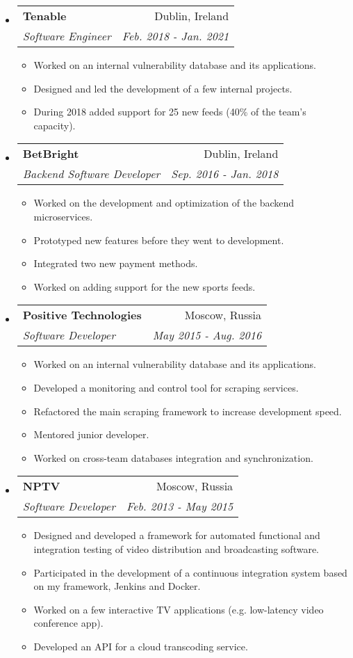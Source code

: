 \documentclass[a4,11pt]{article}
\makeatletter
\newcommand{\resitem}[1]{\item #1 \vspace{-2pt}}
\newcommand{\ressubheading}[4]{
\begin{tabular*}{6.5in}{l@{\cftdotfill{\cftsecdotsep}\extracolsep{\fill}}r}
		\textbf{#1} & #2 \\
		\textit{#3} & \textit{#4} \\
\end{tabular*}\vspace{-6pt}}
\makeatother
\begin{document}
\begin{itemize}
	\item
	      \ressubheading{Tenable}{Dublin, Ireland}{Software Engineer}{Feb. 2018 - Jan. 2021}
	      \begin{itemize}
		      \resitem{Worked on an internal vulnerability database and its applications.}
		      \resitem{Designed and led the development of a few internal projects.}
		      \resitem{During 2018 added support for 25 new feeds (40\% of the team's capacity).}
	      \end{itemize}

	\item
	      \ressubheading{BetBright}{Dublin, Ireland}{Backend Software Developer}{Sep. 2016 - Jan. 2018}
	      \begin{itemize}
		      \resitem{Worked on the development and optimization of the backend microservices.}
		      \resitem{Prototyped new features before they went to development.}
		      \resitem{Integrated two new payment methods.}
		      \resitem{Worked on adding support for the new sports feeds.}
	      \end{itemize}

	\item
	      \ressubheading{Positive Technologies}{Moscow, Russia}{Software Developer}{May 2015 - Aug. 2016}
	      \begin{itemize}
		      \resitem{Worked on an internal vulnerability database and its applications.}
		      \resitem{Developed a monitoring and control tool for scraping services.}
		      \resitem{Refactored the main scraping framework to increase development speed.}
		      \resitem{Mentored junior developer.}
		      \resitem{Worked on cross-team databases integration and synchronization.}
	      \end{itemize}

	\item
	      \ressubheading{NPTV}{Moscow, Russia}{Software Developer}{Feb. 2013 - May 2015}
	      \begin{itemize}
		      \resitem{Designed and developed a framework for automated functional and integration testing of video distribution and broadcasting software.}
		      \resitem{Participated in the development of a continuous integration system based on my framework, Jenkins and Docker.}
		      \resitem{Worked on a few interactive TV applications (e.g. low-latency video conference app).}
		      \resitem{Developed an API for a cloud transcoding service.}
	      \end{itemize}
\end{itemize}
\end{document}
